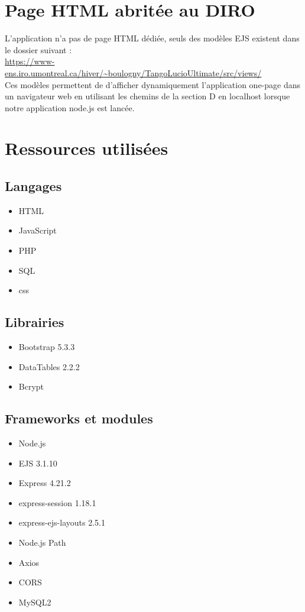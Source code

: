 \documentclass{article}
\begin{document}
\section{Page HTML abritée au DIRO}
L'application n'a pas de page HTML dédiée, seuls des modèles EJS existent dans le dossier suivant : \\
\url{https://www-ens.iro.umontreal.ca/hiver/~boulogny/TangoLucioUltimate/src/views/} \\
Ces modèles permettent de d'afficher dynamiquement l'application one-page dans un navigateur web en utilisant les chemins de la section D en localhost lorsque notre application node.js est lancée.

\newpage

\section{Ressources utilisées}
\subsection{Langages}
\begin{itemize}
  \item HTML
  \item JavaScript
  \item PHP
  \item SQL
  \item css
\end{itemize}
\subsection{Librairies}
\begin{itemize}  
  \item Bootstrap 5.3.3
  \item DataTables 2.2.2
  \item Bcrypt
\end{itemize}
\subsection{Frameworks et modules}
\begin{itemize}  
  \item Node.js
  \item EJS 3.1.10
  \item Express 4.21.2
  \item express-session 1.18.1
  \item express-ejs-layouts 2.5.1
  \item Node.js Path
  \item Axios
  \item CORS 
  \item MySQL2
\end{itemize}
\end{document}
